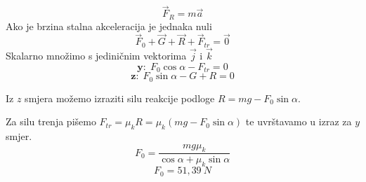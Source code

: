 

$$ \vec{F}_R=m\vec{a}$$
Ako je brzina stalna akceleracija je jednaka nuli
$$\vec{F}_0+\vec{G}+\vec{R}+\vec{F}_{tr}=\vec{0} $$
Skalarno množimo s jediničnim vektorima $\vec{j}$ i $\vec{k}$
$$ \textbf{y:}\ \  F_0\cos\alpha -F_{tr}=0 $$
$$  \textbf{z:}\ \ F_0\sin\alpha-G + R =0$$

Iz $z$ smjera možemo izraziti silu reakcije podloge
$R=mg-F_0\sin\alpha$.
 
Za silu trenja pišemo $F_{tr}=\mu_k R=\mu_k (mg-F_0\sin\alpha)$ te uvrštavamo u izraz za $y$ smjer.
$$
F_0=\frac{mg\mu_k}{\cos\alpha+\mu_k\sin\alpha}
$$
$$
F_0=51,39\ N
$$

